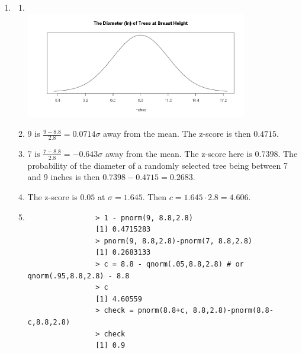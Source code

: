 \documentclass[12pt,letterpaper]{article}
\begin{document}
\begin{enumerate}
	\item 
		\begin{enumerate}
			\item \hfill\\ \includegraphics[width=0.8\textwidth]{5a.png}
			\item 9 is $\frac{9-8.8}{2.8} = 0.0714\sigma$ away from the mean.
				The z-score is then $\boxed{0.4715}$.
			\item 7 is $\frac{7-8.8}{2.8} = -0.643\sigma$ away from the mean.
				The z-score here is $0.7398$. The probability of the diameter
				of a randomly selected tree being between 7 and 9 inches is
				then $0.7398 - 0.4715 = \boxed{0.2683}$.
			\item The z-score is $0.05$ at $\sigma = 1.645$. Then $c = 1.645 \cdot 2.8 = \boxed{4.606}$.
			\item
				\begin{verbatim}
				> 1 - pnorm(9, 8.8,2.8)
				[1] 0.4715283
				> pnorm(9, 8.8,2.8)-pnorm(7, 8.8,2.8)
				[1] 0.2683133
				> c = 8.8 - qnorm(.05,8.8,2.8) # or qnorm(.95,8.8,2.8) - 8.8
				> c 
				[1] 4.60559
				> check = pnorm(8.8+c, 8.8,2.8)-pnorm(8.8-c,8.8,2.8)
				> check
				[1] 0.9
				\end{verbatim}
		\end{enumerate}
\end{enumerate}
\end{document}
